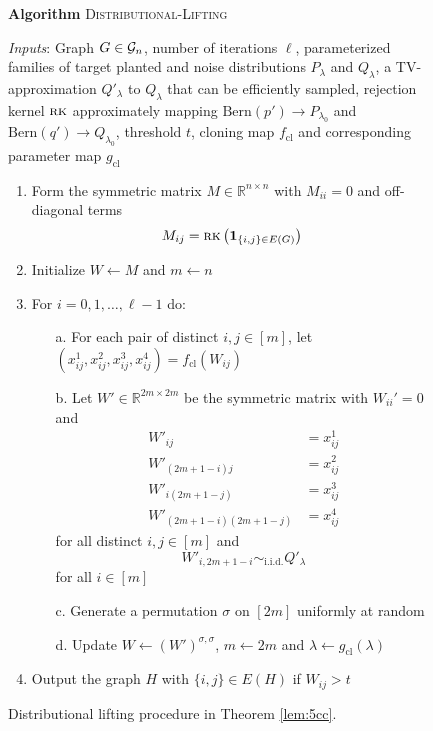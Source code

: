 \begin{figure}[t!]
\begin{algbox}
\textbf{Algorithm} \textsc{Distributional-Lifting}

\vspace{2mm}

\textit{Inputs}: Graph $G \in \mathcal{G}_n$, number of iterations $\ell$, parameterized families of target planted and noise distributions $P_\lambda$ and $Q_{\lambda}$, a TV-approximation $Q'_{\lambda}$ to $Q_{\lambda}$ that can be efficiently sampled, rejection kernel $\textsc{rk}$ approximately mapping $\text{Bern}(p') \to P_{\lambda_0}$ and $\text{Bern}(q') \to Q_{\lambda_0}$, threshold $t$, cloning map $f_{\text{cl}}$ and corresponding parameter map $g_{\text{cl}}$
\begin{enumerate}
\item Form the symmetric matrix $M \in \mathbb{R}^{n \times n}$ with $M_{ii} = 0$ and off-diagonal terms
$$M_{ij} = \textsc{rk}\left(\mathbf{1}_{\{i, j \} \in E(G)}\right)$$
\item Initialize $W \gets M$ and $m \gets n$
\item For $i = 0, 1, \dots, \ell - 1$ do:
\begin{enumerate}
\item[a.] For each pair of distinct $i, j \in [m]$, let $(x_{ij}^1, x_{ij}^2, x_{ij}^3, x_{ij}^4) = f_{\text{cl}}(W_{ij})$
\item[b.] Let $W' \in\mathbb{R}^{2m \times 2m}$ be the symmetric matrix with $W_{ii}' = 0$ and
\begin{align*}
W'_{ij} &= x^1_{ij} \\
W'_{(2m+1 - i)j} &=  x^2_{ij} \\
W'_{i(2m + 1 - j)} &=  x^3_{ij} \\
W'_{(2m+1 - i)(2m + 1 - j)} &=  x^4_{ij}
\end{align*}
for all distinct $i, j \in [m]$ and
$$W'_{i, 2m+1 - i} \sim_{\text{i.i.d.}} Q'_{\lambda}$$
for all $i \in [m]$
\item[c.] Generate a permutation $\sigma$ on $[2m]$ uniformly at random
\item[d.] Update $W \gets (W')^{\sigma, \sigma}$, $m \gets 2m$ and $\lambda \gets g_{\text{cl}}(\lambda)$
\end{enumerate}
\item Output the graph $H$ with $\{i, j \} \in E(H)$ if $W_{ij} > t$
\end{enumerate}
\vspace{1mm}
\end{algbox}
\caption{Distributional lifting procedure in Theorem \ref{lem:5cc}.}
\end{figure}

